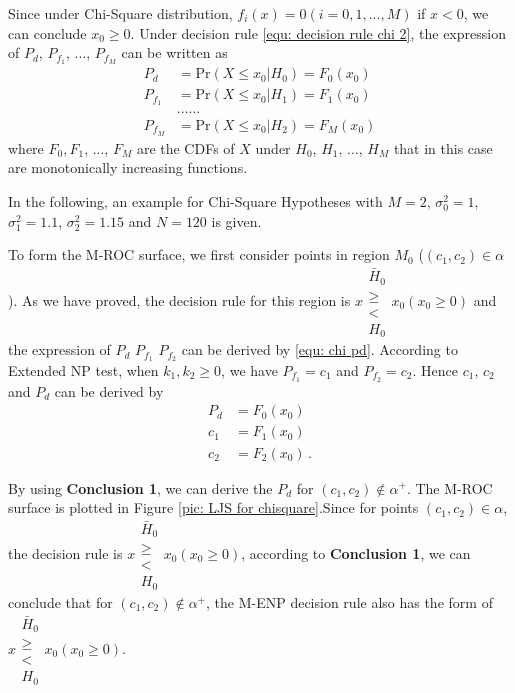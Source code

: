 \documentclass[12pt,journal,a4paper,twoside,doublecolumn]{IEEEtran}
\begin{document}
\begin{spacing}{1.0}
Since under Chi-Square distribution, $f_i(x) =0 (i = 0, 1, ..., M)$ if $x<0$, we can conclude $x_0 \geq 0$.
Under decision rule \eqref{equ: decision rule chi 2}, the expression of $P_d$, $P_{f_1}$, ..., $P_{f_M}$ can be written as
\begin{equation}
\label{equ: chi pd}
  \begin{split}
    P_d &= \text{Pr}(X \leq x_0 | H_0) = F_0(x_0)\\
        P_{f_1} &= \text{Pr}(X \leq x_0 | H_1) = F_1(x_0)\\
        &......\\
            P_{f_M} &= \text{Pr}(X \leq x_0 | H_2) = F_M(x_0)
  \end{split}
\end{equation}
where $F_0, F_1$, ..., $F_M$  are the CDFs of $X$ under $H_0$, $H_1$, ..., $H_M$ that in this case are monotonically increasing functions.

In the following, an example for Chi-Square Hypotheses with $M=2$, $\sigma_0^2 = 1$, $\sigma_1^2 = 1.1$, $\sigma_2^2 = 1.15$ and $N=120$ is given.

To form the M-ROC surface, we first consider points in region $M_0$ ($(c_1, c_2) \in \alpha$). As we have proved, the decision rule for this region is $x \substack{\bar{H}_0 \\\geq\\< \\ H_0 } x_0 (x_0 \geq 0)$ and the expression of $P_d$ $P_{f_1}$ $P_{f_2}$ can be derived by \eqref{equ: chi pd}.  According to Extended NP test, when $k_1, k_2 \geq 0$, we have $P_{f_1} = c_1$ and $P_{f_2} = c_2$. Hence $c_1$, $c_2$ and $P_d$ can be derived by
\begin{equation}
\begin{split}
P_d &= F_0(x_0)\\
c_1 &= F_1(x_0)\\
c_2 &= F_2(x_0)\,.
\end{split}
\end{equation}

By using \textbf{Conclusion 1}, we can derive the $P_d$ for $(c_1, c_2) \notin \alpha^+$.
The M-ROC surface is plotted in Figure \ref{pic: LJS for chisquare}.Since for points $(c_1, c_2) \in \alpha$, the decision rule is  $x \substack{\bar{H}_0 \\\geq\\< \\ H_0 } x_0 (x_0 \geq 0)$, according to \textbf{Conclusion 1}, we can conclude that for $(c_1, c_2) \notin \alpha^+$, the M-ENP decision rule also has the form of $x \substack{\bar{H}_0 \\\geq\\< \\ H_0 } x_0 (x_0 \geq 0)$.  

\end{spacing}
\end{document}
